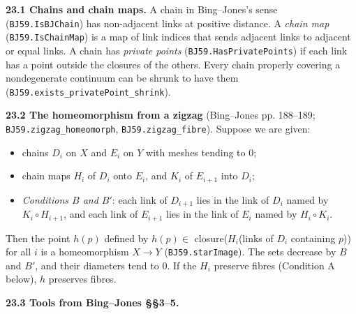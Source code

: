 \documentclass[11pt]{article}
\newcommand{\lean}[1]{\texttt{#1}}
\begin{document}
\textbf{23.1 Chains and chain maps.} A chain in Bing--Jones's sense (\lean{BJ59.\hspace{0pt}IsBJChain}) has non-adjacent links at positive distance. A \emph{chain map} (\lean{BJ59.\hspace{0pt}IsChainMap}) is a map of link indices that sends adjacent links to adjacent or equal links. A chain has \emph{private points} (\lean{BJ59.\hspace{0pt}HasPrivatePoints}) if each link has a point outside the closures of the others. Every chain properly covering a nondegenerate continuum can be shrunk to have them (\lean{BJ59.\hspace{0pt}exists\_\hspace{0pt}privatePoint\_\hspace{0pt}shrink}).

\textbf{23.2 The homeomorphism from a zigzag} (Bing--Jones pp. 188--189; \lean{BJ59.\hspace{0pt}zigzag\_\hspace{0pt}homeomorph}, \lean{BJ59.\hspace{0pt}zigzag\_\hspace{0pt}fibre}). Suppose we are given:

\begin{itemize}
  \item chains $D_i$ on $X$ and $E_i$ on $Y$ with meshes tending to 0;
  \item chain maps $H_i$ of $D_i$ onto $E_i$, and $K_i$ of $E_{i+1}$ into $D_i$;
  \item \emph{Conditions $B$ and $B'$}: each link of $D_{i+1}$ lies in the link of $D_i$ named by $K_i \circ H_{i+1}$, and each link of $E_{i+1}$ lies in the link of $E_i$ named by $H_i \circ K_i$.
\end{itemize}

Then the point $h(p)$ defined by $h(p) \in$ closure($H_i$(links of $D_i$ containing $p$)) for all $i$ is a homeomorphism $X \to Y$ (\lean{BJ59.\hspace{0pt}starImage}). The sets decrease by $B$ and $B'$, and their diameters tend to 0. If the $H_i$ preserve fibres (Condition A below), $h$ preserves fibres.

\textbf{23.3 Tools from Bing--Jones \S{}\S{}3--5.}
\end{document}
